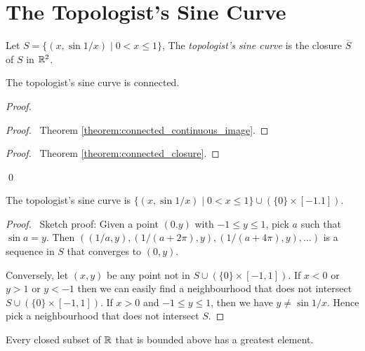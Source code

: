 \section{The Topologist's Sine Curve}

\begin{definition}
    Let $S = \{ (x, \sin 1/x) \mid 0 < x \leq 1 \}$, The \emph{topologist's sine curve} is the closure $\overline{S}$ of $S$ in $\mathbb{R}^2$.
\end{definition}

\begin{proposition}
    The topologist's sine curve is connected.
\end{proposition}

\begin{proof}
    \pf
    \begin{proof}
        \pf\ Theorem \ref{theorem:connected_continuous_image}.
    \end{proof}
    \begin{proof}
        \pf\ Theorem \ref{theorem:connected_closure}.
    \end{proof}
    \qed
\end{proof}

\begin{proposition}
    The topologist's sine curve is $\{ (x, \sin 1/x) \mid 0 < x \leq 1 \}
    \cup (\{0\} \times [-1.1])$.
\end{proposition}

\begin{proof}
    \pf\ Sketch proof: Given a point $(0.y)$ with $-1 \leq y \leq 1$, pick $a$ such that $\sin a = y$. Then $((1/a,y), (1/(a+2\pi),y), (1/(a+4\pi),y), \ldots)$ is a sequence
    in $S$ that converges to $(0,y)$.

    Conversely, let $(x,y)$ be any point not in $S \cup (\{0\} \times [-1,1])$. If $x < 0$ or $y > 1$ or $y < -1$ then we can easily find a neighbourhood that does not intersect
    $S \cup (\{0\} \times [-1,1])$. If $x > 0$ and $-1 \leq y \leq 1$, then we have $y \neq \sin 1/x$. Hence pick a neighbourhood that does not intersect $S$.
\end{proof}

\begin{proposition}
    \label{proposition:greatest_element_closed}
    Every closed subset of $\mathbb{R}$ that is bounded above has a greatest element.
\end{proposition}

